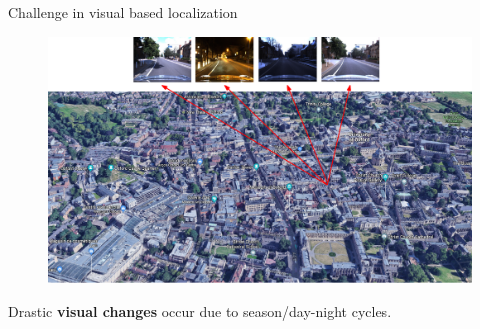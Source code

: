 \begin{frame}{Challenge in visual based localization}
	\begin{minipage}{0.75\linewidth}
		\begin{figure}
			\includegraphics[width=\linewidth]{vect/intro/fig4/1}
		\end{figure}		
	\end{minipage}
	\hfill
	\begin{minipage}{0.18\linewidth}
		Drastic \textbf{visual changes} occur due to season/day-night cycles.
	\end{minipage}
\end{frame}	

